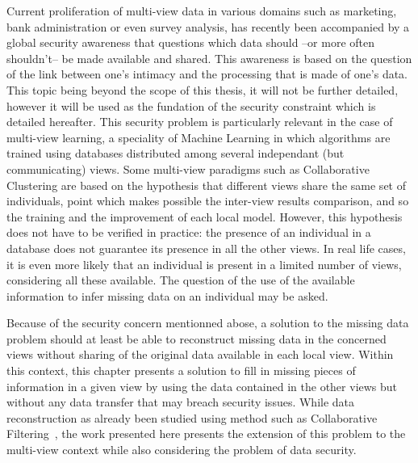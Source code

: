 Current proliferation of multi-view data in various domains such as marketing, bank administration or even survey analysis, has recently been accompanied by a global security awareness that questions which data should --or more often shouldn't-- be made available and shared. This awareness is based on the question of the link between one's intimacy and the processing that is made of one's data. This topic being beyond the scope of this thesis, it will not be further detailed, however it will be used as the fundation of the security constraint which is detailed hereafter. This security problem is particularly relevant in the case of multi-view learning, a speciality of Machine Learning in which algorithms are trained using databases distributed among several independant (but communicating) views. Some multi-view paradigms such as Collaborative Clustering are based on the hypothesis that different views share the same set of individuals, point which makes possible the inter-view results comparison, and so the training and the improvement of each local model. However, this hypothesis does not have to be verified in practice: the presence of an individual in a database does not guarantee its presence in all the other views. In real life cases, it is even more likely that an individual is present in a limited number of views, considering all these available. The question of the use of the available information to infer missing data on an individual may be asked.
	
Because of the security concern mentionned abose, a solution to the missing data problem should at least be able to reconstruct missing data in the concerned views without sharing of the original data available in each local view.	Within this context, this chapter presents a solution to fill in missing pieces of information in a given view by using the data contained in the other views but without any data transfer that may breach security issues. While data reconstruction as already been studied using method such as Collaborative Filtering~\cite{koren2015advances}, the work presented here presents the extension of this problem to the multi-view context while also considering the problem of data security.

